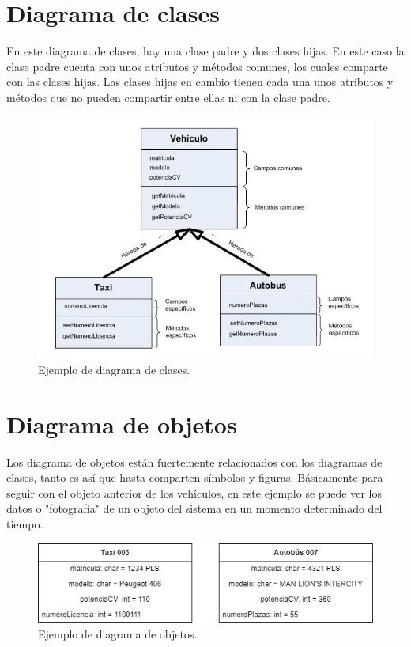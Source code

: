 \documentclass[a4paper, 12pt]{book}
\begin{document}
\section{Diagrama de clases}
En este diagrama de clases, hay una clase padre y dos clases hijas. En este caso la clase padre cuenta con unos atributos y métodos comunes, los cuales comparte con las clases hijas. Las clases hijas en cambio tienen cada una unos atributos y métodos que no pueden compartir entre ellas ni con la clase padre.
\begin{figure}
	\centering
	\includegraphics[width=14cm, keepaspectratio]{img/diagrama_clases.png}
	\caption{Ejemplo de diagrama de clases.}\label{fig:diagrama_clases}
\end{figure}

\section{Diagrama de objetos}
Los diagrama de objetos están fuertemente relacionados con los diagramas de clases, tanto es así que hasta comparten símbolos y figuras. Básicamente para seguir con el objeto anterior de los vehículos, en este ejemplo se puede ver los datos o "fotografía" de un objeto del sistema en un momento determinado del tiempo. 
\begin{figure}
	\centering
	\includegraphics[width=14cm, keepaspectratio]{img/diagrama_objetos.png}
	\caption{Ejemplo de diagrama de objetos.}\label{fig:diagrama_objetos}
\end{figure}
\end{document}
